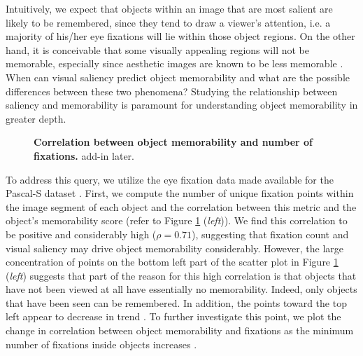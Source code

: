 Intuitively, we expect that objects within an image that are most salient are likely to be remembered, since they tend to draw a viewer's attention, i.e. a majority of his/her eye fixations will lie within those object regions. On the other hand, it is conceivable that some visually appealing regions will not be memorable, especially since aesthetic images are known to be less memorable \cite{isola11,isola14}. When can visual saliency predict object memorability and what are the possible differences between these two phenomena? Studying the relationship between saliency and memorability is paramount for understanding object memorability in greater depth.

\begin{figure}[!htb]
\centering
{}
\vspace{-5mm}\caption{\footnotesize\textbf{Correlation between object memorability and number of fixations.} add-in later. }\label{fig:scatterFixation}
\end{figure}


To address this query, we utilize the eye fixation data made available for the Pascal-S dataset \cite{yin14}. First, we compute the number of unique fixation points within the image segment of each object and the correlation between this metric and the object’s memorability score (refer to Figure \ref{fig:scatterFixation} (\emph{left})). We find this correlation to be positive and considerably high ($\rho = 0.71$), suggesting that fixation count and visual saliency may drive object memorability considerably. However, the large concentration of points on the bottom left part of the scatter plot in Figure \ref{fig:scatterFixation} (\emph{left}) suggests that part of the reason for this high correlation is that objects that have not been viewed  at all have essentially no memorability. Indeed, only objects that have been seen can be remembered. In addition, the points toward the top left appear to decrease in trend . To further investigate this point, we plot the change in correlation between object memorability and fixations as the minimum number of fixations inside objects increases .


